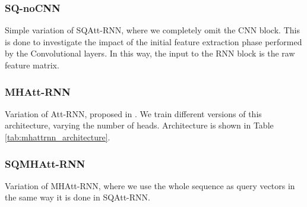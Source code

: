 \subsubsection{\textbf{SQ-noCNN}}
Simple variation of SQAtt-RNN, where we completely omit the CNN block. This is done to investigate the impact of the initial feature extraction phase performed by the Convolutional layers. In this way, the input to the RNN block is the raw feature matrix.

\subsubsection{\textbf{MHAtt-RNN}}
Variation of Att-RNN, proposed in \cite{streamingkws2020Rybakov}. We train different versions of this architecture, varying the number of heads. Architecture is shown in Table \ref{tab:mhattrnn_architecture}.

\begin{table}[h!]
	\centering
	\caption{MHAtt-RNN$h$ architecture, where $h$ is the number of heads for the MH Attention layer.}
	\label{tab:mhattrnn_architecture}
\end{table}

\subsubsection{\textbf{SQMHAtt-RNN}}
Variation of MHAtt-RNN, where we use the whole sequence as query vectors in the same way it is done in SQAtt-RNN.


